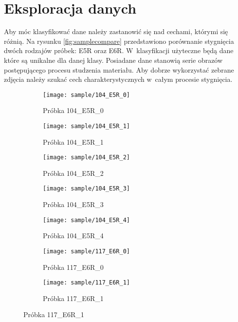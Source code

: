 \section{Eksploracja danych}
Aby móc klasyfikować dane należy zastanowić się nad cechami, którymi się
różnią.
Na rysunku \ref{fig:samplecompare} przedstawiono porównanie stygnięcia
dwóch rodzajów próbek: E5R oraz E6R.
W~klasyfikacji użyteczne będą dane które są unikalne dla danej klasy.
Posiadane dane stanowią serie obrazów postępującego procesu studzenia
materiału.
Aby dobrze wykorzystać zebrane zdjęcia należy szukać cech charakterystycznych
w~całym procesie stygnięcia.
\begin{figure}[htbp]
	\centering
	\begin{subfigure}{0.3\textwidth}
		\centering
		\texttt{[image: sample/104\_E5R\_0]}
		\caption{Próbka 104\_E5R\_0}
	\end{subfigure}
	\hspace{0.25cm}
	\vspace{0.5cm}
	\begin{subfigure}{0.3\textwidth}
		\centering
		\texttt{[image: sample/104\_E5R\_1]}
		\caption{Próbka 104\_E5R\_1}
	\end{subfigure}
	\hspace{0.25cm}
	\begin{subfigure}{0.3\textwidth}
		\centering
		\texttt{[image: sample/104\_E5R\_2]}
		\caption{Próbka 104\_E5R\_2}
	\end{subfigure}
	\begin{subfigure}{0.3\textwidth}
		\centering
		\texttt{[image: sample/104\_E5R\_3]}
		\caption{Próbka 104\_E5R\_3}
	\end{subfigure}
	\hspace{0.25cm}
	\vspace{0.5cm}
	\begin{subfigure}{0.3\textwidth}
		\centering
		\texttt{[image: sample/104\_E5R\_4]}
		\caption{Próbka 104\_E5R\_4}
	\end{subfigure}
	\hspace{0.25cm}
	\begin{subfigure}{0.3\textwidth}
		\centering
		\texttt{[image: sample/117\_E6R\_0]}
		\caption{Próbka 117\_E6R\_0}
	\end{subfigure}
	\begin{subfigure}{0.3\textwidth}
		\centering
		\texttt{[image: sample/117\_E6R\_1]}
		\caption{Próbka 117\_E6R\_1}

\end{subfigure}
\end{figure}
